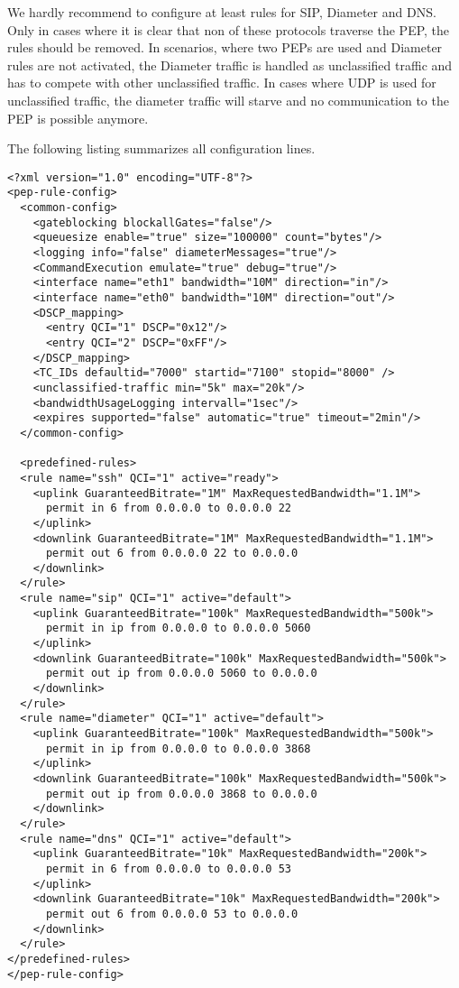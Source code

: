 We hardly recommend to configure at least rules for SIP, Diameter and DNS. 
Only in cases where it is clear that non of these protocols traverse the PEP, the rules should be removed. 
In scenarios, where two PEPs are used and Diameter rules are not activated, the Diameter traffic is handled as unclassified traffic and has to compete with other unclassified traffic.
In cases where UDP is used for unclassified traffic, the diameter traffic will starve and no communication to the PEP is possible anymore.

The following listing summarizes all configuration lines.
\begin{lstlisting}[caption=Example of a PEP Enforcement Setting, label={lst:PEPContainer}]
<?xml version="1.0" encoding="UTF-8"?>
<pep-rule-config>
  <common-config>
    <gateblocking blockallGates="false"/>
    <queuesize enable="true" size="100000" count="bytes"/>
    <logging info="false" diameterMessages="true"/>
    <CommandExecution emulate="true" debug="true"/>  
    <interface name="eth1" bandwidth="10M" direction="in"/>  
    <interface name="eth0" bandwidth="10M" direction="out"/>  
    <DSCP_mapping>
      <entry QCI="1" DSCP="0x12"/>
      <entry QCI="2" DSCP="0xFF"/>
    </DSCP_mapping>
    <TC_IDs defaultid="7000" startid="7100" stopid="8000" />
    <unclassified-traffic min="5k" max="20k"/>
    <bandwidthUsageLogging intervall="1sec"/>
    <expires supported="false" automatic="true" timeout="2min"/>
  </common-config>

  <predefined-rules>
  <rule name="ssh" QCI="1" active="ready">
    <uplink GuaranteedBitrate="1M" MaxRequestedBandwidth="1.1M">
      permit in 6 from 0.0.0.0 to 0.0.0.0 22
    </uplink>
    <downlink GuaranteedBitrate="1M" MaxRequestedBandwidth="1.1M">
      permit out 6 from 0.0.0.0 22 to 0.0.0.0
    </downlink>
  </rule>
  <rule name="sip" QCI="1" active="default">
    <uplink GuaranteedBitrate="100k" MaxRequestedBandwidth="500k">
      permit in ip from 0.0.0.0 to 0.0.0.0 5060
    </uplink>
    <downlink GuaranteedBitrate="100k" MaxRequestedBandwidth="500k">
      permit out ip from 0.0.0.0 5060 to 0.0.0.0
    </downlink>
  </rule>
  <rule name="diameter" QCI="1" active="default">
    <uplink GuaranteedBitrate="100k" MaxRequestedBandwidth="500k">
      permit in ip from 0.0.0.0 to 0.0.0.0 3868
    </uplink>
    <downlink GuaranteedBitrate="100k" MaxRequestedBandwidth="500k">
      permit out ip from 0.0.0.0 3868 to 0.0.0.0
    </downlink>
  </rule>
  <rule name="dns" QCI="1" active="default">
    <uplink GuaranteedBitrate="10k" MaxRequestedBandwidth="200k">
      permit in 6 from 0.0.0.0 to 0.0.0.0 53
    </uplink>
    <downlink GuaranteedBitrate="10k" MaxRequestedBandwidth="200k">
      permit out 6 from 0.0.0.0 53 to 0.0.0.0
    </downlink>
  </rule>
</predefined-rules>
</pep-rule-config>
	
\end{lstlisting}

